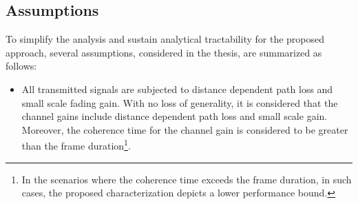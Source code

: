 \subsection{Assumptions}
To simplify the analysis and sustain analytical tractability for the proposed approach, several assumptions, considered in the thesis, are summarized as follows:
\begin{itemize}
\item All transmitted signals are subjected to distance dependent path loss and small scale fading gain. %
With no loss of generality, it is considered that the channel gains include distance dependent path loss and small scale gain. Moreover, the coherence time for the channel gain is considered to be greater than the frame duration\footnote{In the scenarios where the coherence time exceeds the frame duration, in such cases, the proposed characterization depicts a lower performance bound.}. 

\end{itemize}
